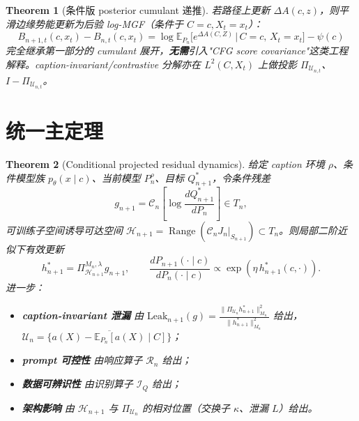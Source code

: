 \documentclass[11pt,a4paper]{article}
\newtheorem{theorem}{Theorem}[section]
\newcommand{\E}{\mathbb{E}}
\newcommand{\cH}{\mathcal{H}}
\newcommand{\cR}{\mathcal{R}}
\newcommand{\cI}{\mathcal{I}}
\newcommand{\cU}{\mathcal{U}}
\newcommand{\ProjectOp}{\Pi}
\newcommand{\Range}{\operatorname{Range}}
\newcommand{\Center}{\mathcal{C}}
\begin{document}
\begin{theorem}[条件版 posterior cumulant 递推]\label{thm:cond_cumulant}
若路径上更新 $\Delta A(c,z)$，则平滑边缘势能更新为后验 log-MGF（条件于 $C=c, X_t=x_t$）：
\begin{equation}\label{eq:cond_mgf}
\boxed{
B_{n+1,t}(c,x_t) - B_{n,t}(c,x_t) = \log \E_{P_n}\!\bigl[e^{\Delta A(C,Z)}\,\big|\,C=c,\,X_t=x_t\bigr] - \psi(c)
}
\end{equation}
完全继承第一部分的 cumulant 展开，\textbf{无需}引入"CFG score covariance"这类工程解释。caption-invariant/contrastive 分解亦在 $L^2(C,X_t)$ 上做投影 $\ProjectOp_{\cU_{n,t}}$、$I-\ProjectOp_{\cU_{n,t}}$。
\end{theorem}

\section{统一主定理}
\label{sec:main_theorem}

\begin{theorem}[Conditional projected residual dynamics]\label{thm:main}
给定 caption 环境 $\rho$、条件模型族 $p_\theta(x\mid c)$、当前模型 $P_n^\rho$、目标 $Q^*_{n+1}$，令条件残差
\[
g_{n+1} = \Center_n\!\left[\log\frac{dQ^*_{n+1}}{dP_n}\right]\in T_n,
\]
可训练子空间诱导可达空间 $\cH_{n+1}=\Range(\Center_n J_n|_{S_{n+1}})\subset T_n$。则局部二阶近似下有效更新
\[
h^*_{n+1}=\ProjectOp^{M_n,\lambda}_{\cH_{n+1}}g_{n+1},\qquad \frac{dP_{n+1}(\cdot\mid c)}{dP_n(\cdot\mid c)}\propto\exp(\eta\,h^*_{n+1}(c,\cdot)).
\]
进一步：
\begin{itemize}[nosep]
\item \textbf{caption-invariant 泄漏} 由 $\displaystyle\mathrm{Leak}_{n+1}(g)=\frac{\|\ProjectOp_{\cU_n}h^*_{n+1}\|^2_{M_n}}{\|h^*_{n+1}\|^2_{M_n}}$ 给出，$\cU_n=\overline{\{a(X)-\E_{P_n}[a(X)\mid C]\}}$；
\item \textbf{prompt 可控性} 由响应算子 $\cR_n$ 给出；
\item \textbf{数据可辨识性} 由识别算子 $\cI_Q$ 给出；
\item \textbf{架构影响} 由 $\cH_{n+1}$ 与 $\ProjectOp_{\cU_n}$ 的相对位置（交换子 $\kappa$、泄漏 $L$）给出。
\end{itemize}
\end{theorem}
\end{document}
